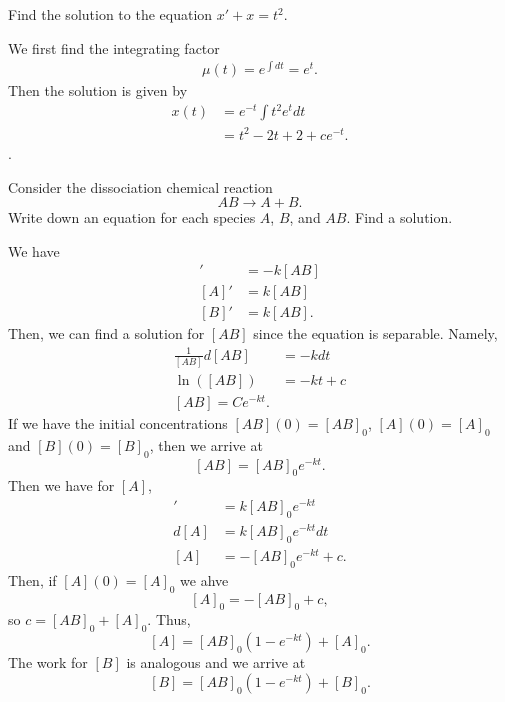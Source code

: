 \documentclass[12pt]{article} %
\begin{document}
\newpage

\begin{problem}
    Find the solution to the equation $x'+x=t^2$.
\end{problem}
\begin{solution}
    We first find the integrating factor
    \begin{align*}
        \mu(t) = e^{\int dt} = e^t.
   \end{align*}
    Then the solution is given by
    \begin{align*}
        x(t) &= e^{-t} \int t^2 e^t dt\\
        &= t^2 -2t + 2 +ce^{-t}.
    \end{align*}.
\end{solution}

\newpage

\begin{problem}
    Consider the dissociation chemical reaction
    \[
        AB \to A + B.
    \]
    Write down an equation for each species $A$, $B$, and $AB$.  Find a solution.
\end{problem}
\begin{solution}
    We have
    \begin{align*}
        [AB]' &= -k[AB]\\
        [A]' &= k[AB]\\
        [B]' &= k[AB].
    \end{align*}
    Then, we can find a solution for $[AB]$ since the equation is separable. Namely,
    \begin{align*}
        \frac{1}{[AB]} d[AB] &= -k dt\\
        \ln([AB]) &= -kt+c\\
        [AB] = Ce^{-kt}.
    \end{align*}
    If we have the initial concentrations $[AB](0)=[AB]_0$, $[A](0)=[A]_0$ and $[B](0)=[B]_0$, then we arrive at
    \[
        \boxed{[AB] = [AB]_0 e^{-kt}.}
    \]
    Then we have for $[A]$,
    \begin{align*}
        [A]' &= k[AB]_0 e^{-kt}\\
        d[A] &= k[AB]_0 e^{-kt} dt\\
        [A] &= -[AB]_0 e^{-kt} + c.
    \end{align*}
    Then, if $[A](0)=[A]_0$ we ahve
    \[ 
        [A]_0 = -[AB]_0 +c,
    \]
    so $c= [AB]_0 + [A]_0$. Thus,
    \[
        \boxed{[A]= [AB]_0 (1-e^{-kt}) + [A]_0.}
    \]
    The work for $[B]$ is analogous and we arrive at
    \[
      \boxed{[B] = [AB]_0 (1-e^{-kt}) +[B]_0.}  
    \]
\end{solution}
\end{document}
